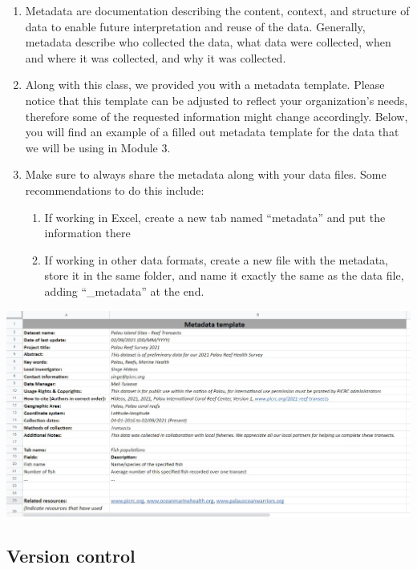 \documentclass[
]{book}
\providecommand{\tightlist}{%
  \setlength{\itemsep}{0pt}\setlength{\parskip}{0pt}}
\begin{document}
\begin{enumerate}
\def\labelenumi{\arabic{enumi}.}
\item
  Metadata are documentation describing the content, context, and structure of data to enable future interpretation and reuse of the data. Generally, metadata describe who collected the data, what data were collected, when and where it was collected, and why it was collected.
\item
  Along with this class, we provided you with a metadata template. Please notice that this template can be adjusted to reflect your organization's needs, therefore some of the requested information might change accordingly. Below, you will find an example of a filled out metadata template for the data that we will be using in Module 3.
\item
  Make sure to always share the metadata along with your data files. Some recommendations to do this include:

  \begin{enumerate}
  \def\labelenumii{\arabic{enumii}.}
  \tightlist
  \item
    If working in Excel, create a new tab named ``metadata'' and put the information there
  \item
    If working in other data formats, create a new file with the metadata, store it in the same folder, and name it exactly the same as the data file, adding ``\_metadata'' at the end.
  \end{enumerate}
\end{enumerate}

\includegraphics{images/m2s1_metadata_template_filled.jpg}

\hypertarget{version-control}{%
\subsection{Version control}\label{version-control}}
\end{document}
